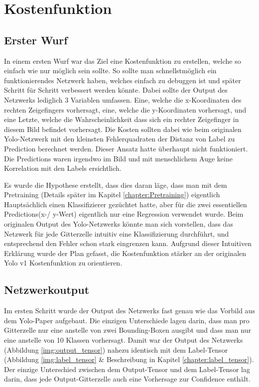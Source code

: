 \newpage
\section{Kostenfunktion} 
\subsection{Erster Wurf}
\label{chapter:erster_wurf}
In einem ersten Wurf war das Ziel eine Kostenfunktion zu erstellen, welche so einfach wie nur möglich sein sollte. 
So sollte man schnellstmöglich ein funktionierendes Netzwerk haben, welches einfach zu debuggen ist und später Schritt für Schritt verbessert werden könnte.
Dabei sollte der Output des Netzwerks lediglich 3 Variablen umfassen. Eine, welche die x-Koordinaten des rechten Zeigefingers vorhersagt, eine, welche die y-Koordinaten vorhersagt, und eine Letzte, welche die Wahrscheinlichkeit dass sich ein rechter Zeigefinger in diesem Bild befindet vorhersagt.
Die Kosten sollten dabei wie beim originalen Yolo-Netzwerk mit den kleinsten Fehlerquadraten der Distanz von Label zu Prediction berechnet werden.
Dieser Ansatz hatte überhaupt nicht funktioniert.
Die Predictions waren irgendwo im Bild und mit menschlichem Auge keine Korrelation mit den Labels ersichtlich. 

Es wurde die Hypothese erstellt, dass dies daran läge, dass man mit dem Pretraining (Details später im Kapitel \ref{chapter:Pretraining}) eigentlich Hauptsächlich einen Klassifizierer \grqq{}gezüchtet\grqq{} hatte, aber für die zwei essentiellen Predictions(x-/ y-Wert) eigentlich nur eine Regression verwendet wurde.
Beim originalen Output des Yolo-Netzwerks könnte man sich vorstellen, dass das Netzwerk für jede Gitterzelle intuitiv eine Klassifizierung durchführt, und entsprechend den Fehler schon stark eingrenzen kann.
Aufgrund dieser Intuitiven Erklärung wurde der Plan gefasst, die Kostenfunktion stärker an der originalen Yolo v1 Kostenfunktion zu orientieren.

\subsection{Netzwerkoutput}
Im ersten Schritt wurde der Output des Netzwerks fast genau wie das Vorbild aus dem Yolo-Paper \cite{yolo} aufgebaut. 
Die einzigen Unterschiede lagen darin, dass man pro Gitterzelle nur eine anstelle von zwei Bounding-Boxen ausgibt und dass man nur eine anstelle von 10 Klassen vorhersagt. 
Damit war der Output des Netzwerks (Abbildung \ref{img:output_tensor}) nahezu identisch mit dem Label-Tensor (Abbildung \ref{img:label_tensor} \& Beschreibung in Kapitel \ref{chapter:label_tensor}).
Der einzige Unterschied zwischen dem Output-Tensor und dem Label-Tensor lag darin, dass jede Output-Gitterzelle auch eine Vorhersage zur Confidence enthält. 

